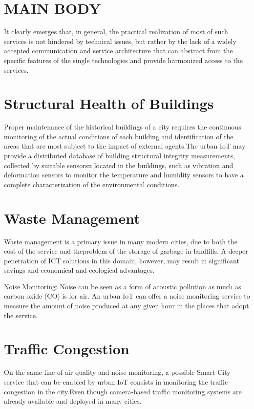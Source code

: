 \documentclass[conference,column]{IEEEtran}
\begin{document}
\section{MAIN BODY}
It clearly emerges that, in general, the practical realization of most of such services is not hindered by technical issues, but rather by the lack of a widely accepted communication and service
architecture that can abstract from the specific features of the single technologies and provide harmonized access to the services.




\section{Structural Health of Buildings}
Proper maintenance of the historical buildings of a city requires the continuous monitoring of the actual conditions of each building and identification of
the areas that are most subject to the impact of external agents.The urban IoT may provide a distributed database of building structural integrity measurements, collected by suitable sensorsn located in the buildings, such as vibration and deformation  sensors to monitor the temperature and humidity sensors to have a complete characterization of the environmental conditions.




\section{Waste Management}
Waste management is a primary issue in many modern cities, due to both the cost of the service and theproblem of the storage of garbage in landfills. A deeper penetration of ICT solutions in this domain, however, may result in significant savings and economical and ecological advantages.

Noise Monitoring: 
Noise can be seen as a form of acoustic pollution as much as carbon oxide (CO) is for air. An urban IoT can offer a noise monitoring service to measure the amount of noise produced at any given hour in the places that adopt the service.




\vfill\null


\section{Traffic Congestion}
On the same line of air quality and noise monitoring, a possible Smart City service that can be enabled by urban IoT consists in monitoring the traffic congestion in the city.Even though camera-based traffic monitoring systems are already available and deployed in many cities.
\end{document}
